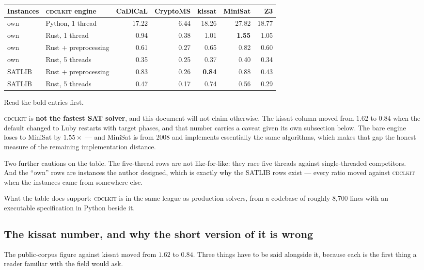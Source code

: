 \documentclass[11pt,a4paper]{article}
\newcommand{\cdclkit}{\textsc{cdclkit}}
\begin{document}
\begin{table}[h]
\centering
\begin{tabular}{llrrrrr}
\toprule
Instances & \cdclkit{} engine & CaDiCaL & CryptoMS & kissat & MiniSat & Z3 \\
\midrule
own    & Python, 1 thread    & 17.22 & 6.44 & 18.26 & 27.82 & 18.77 \\
own    & Rust, 1 thread      & 0.94 & 0.38 & 1.01 & \textbf{1.55} & 1.05 \\
own    & Rust + preprocessing & 0.61 & 0.27 & 0.65 & 0.82 & 0.60 \\
own    & Rust, 5 threads     & 0.35 & 0.25 & 0.37 & 0.40 & 0.34 \\
\midrule
SATLIB & Rust + preprocessing & 0.83 & 0.26 & \textbf{0.84} & 0.88 & 0.43 \\
SATLIB & Rust, 5 threads     & 0.47 & 0.17 & 0.74 & 0.56 & 0.29 \\
\bottomrule
\end{tabular}
\end{table}

Read the bold entries first.

\cdclkit{} is \textbf{not the fastest SAT solver}, and this document will not
claim otherwise. The kissat column moved from $1.62$ to $0.84$ when the
default changed to Luby restarts with target phases, and that number carries a
caveat given its own subsection below. The bare engine loses
to MiniSat by $1.55\times$ --- and MiniSat is from 2008 and implements
essentially the same algorithms, which makes that gap the honest measure of the
remaining implementation distance.

Two further cautions on the table. The five-thread rows are not like-for-like:
they race five threads against single-threaded competitors. And the ``own''
rows are instances the author designed, which is exactly why the SATLIB rows
exist --- every ratio moved against \cdclkit{} when the instances came from
somewhere else.

What the table does support: \cdclkit{} is in the same league as production
solvers, from a codebase of roughly 8{,}700 lines with an executable
specification in Python beside it.

\subsection*{The kissat number, and why the short version of it is wrong}

The public-corpus figure against kissat moved from $1.62$ to $0.84$. Three
things have to be said alongside it, because each is the first thing a reader
familiar with the field would ask.
\end{document}
